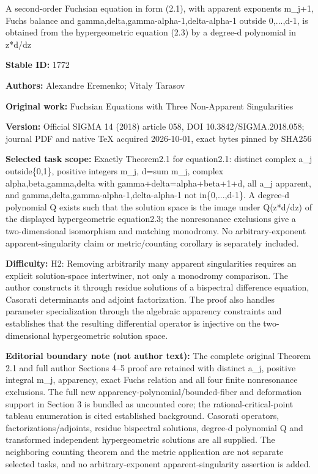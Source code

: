 \documentclass[11pt]{article}
\numberwithin{equation}{section}
\begin{document}
\begin{center}\Large A second-order Fuchsian equation in form (2.1), with apparent exponents m\_j+1, Fuchs balance and gamma,delta,gamma-alpha-1,delta-alpha-1 outside 0,...,d-1, is obtained from the hypergeometric equation (2.3) by a degree-d polynomial in z*d/dz\end{center}
\noindent\textbf{Stable ID:} 1772\par
\noindent\textbf{Authors:} Alexandre Eremenko; Vitaly Tarasov\par
\noindent\textbf{Original work:} Fuchsian Equations with Three Non-Apparent Singularities\par
\noindent\textbf{Version:} Official SIGMA 14 (2018) article 058, DOI 10.3842/SIGMA.2018.058; journal PDF and native TeX acquired 2026-10-01, exact bytes pinned by SHA256\par
\noindent\textbf{Selected task scope:} Exactly Theorem2.1 for equation2.1: distinct complex a\_j outside\{0,1\}, positive integers m\_j, d=sum m\_j, complex alpha,beta,gamma,delta with gamma+delta=alpha+beta+1+d, all a\_j apparent, and gamma,delta,gamma-alpha-1,delta-alpha-1 not in\{0,...,d-1\}. A degree-d polynomial Q exists such that the solution space is the image under Q(z*d/dz) of the displayed hypergeometric equation2.3; the nonresonance exclusions give a two-dimensional isomorphism and matching monodromy. No arbitrary-exponent apparent-singularity claim or metric/counting corollary is separately included.\par
\noindent\textbf{Difficulty:} H2: Removing arbitrarily many apparent singularities requires an explicit solution-space intertwiner, not only a monodromy comparison. The author constructs it through residue solutions of a bispectral difference equation, Casorati determinants and adjoint factorization. The proof also handles parameter specialization through the algebraic apparency constraints and establishes that the resulting differential operator is injective on the two-dimensional hypergeometric solution space.\par
\noindent\textbf{Editorial boundary note (not author text):} The complete original Theorem 2.1 and full author Sections 4–5 proof are retained with distinct a\_j, positive integral m\_j, apparency, exact Fuchs relation and all four finite nonresonance exclusions. The full new apparency-polynomial/bounded-fiber and deformation support in Section 3 is bundled as uncounted core; the rational-critical-point tableau enumeration is cited established background. Casorati operators, factorizations/adjoints, residue bispectral solutions, degree-d polynomial Q and transformed independent hypergeometric solutions are all supplied. The neighboring counting theorem and the metric application are not separate selected tasks, and no arbitrary-exponent apparent-singularity assertion is added.\par
\end{document}
